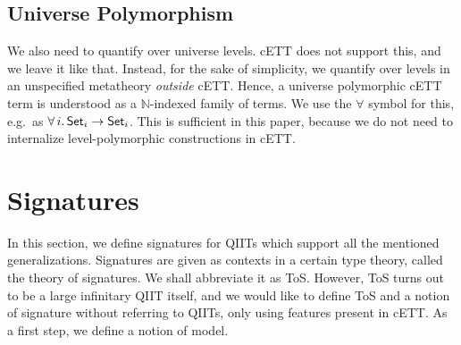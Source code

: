 \documentclass{llncs}
\begin{document}
\subsection{Universe Polymorphism}
\label{sec:universe_polymorphism}

We also need to quantify over universe levels. cETT does not support this, and
we leave it like that. Instead, for the sake of simplicity, we quantify over
levels in an unspecified metatheory \emph{outside} cETT. Hence, a universe
polymorphic cETT term is understood as a $\mathbb{N}$-indexed family of
terms. We use the $\forall$ symbol for this, e.g.\ as $\forall\,i.\,\mathsf{Set}_i \rightarrow
\mathsf{Set}_i$. This is sufficient in this paper, because we do not need to internalize
level-polymorphic constructions in cETT.

\section{Signatures}
\label{sec:tos}

In this section, we define signatures for QIITs which support all the mentioned
generalizations. Signatures are given as contexts in a certain type theory,
called the theory of signatures. We shall abbreviate it as ToS. However, ToS
turns out to be a large infinitary QIIT itself, and we would like to define ToS
and a notion of signature without referring to QIITs, only using features
present in cETT. As a first step, we define a notion of model.
\end{document}
